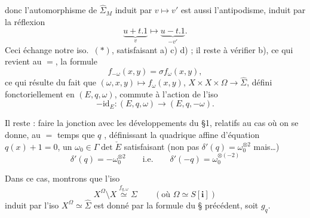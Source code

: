 \documentclass[11pt,a4paper]{article}
\begin{document}
donc l'automorphisme de $\hat{\Sigma}_{M}$ induit par $v \mapsto v'$ est aussi l'antipodisme, induit par la réflexion
\[
  \underset{v}{\underbrace{u + t.1}} \longmapsto \underset{-v'}{\underbrace{u - t.1}} .
\]
Ceci  échange  notre iso.\ $(\ast)$, satisfaisant a) c) d) ; il reste à vérifier b), ce qui revient au $=$, la formule
\[
  f_{-\omega}(x,y) = \sigma f_{\omega}(x,y),
\]
ce qui résulte du fait que $(\omega, x, y) \mapsto f_{\omega}(x,y)$, $X \times X \times \Omega \longrightarrow \hat{\Sigma}$,  défini fonctoriellement en $(E, q, \omega)$, commute à l'action de l'iso
\[
  -\mathrm{id}_{E} : (E, q, \omega) \longrightarrow (E, q, -\omega).
\]

Il reste : faire la jonction avec les développements du §1, relatifs au cas où on se donne, au $=$ temps que $q$ , définissant la quadrique affine d'équation $q(x) + 1 = 0$, un $\omega_{0} \in \Gamma \det \check{E}$ satisfaisant (non pas $\delta'(q) = \omega_{0}^{\otimes 2}$ mais…)
\[
  \delta'(q) = -\omega_{0}^{\otimes 2} \qquad \text{i.e.} \qquad \delta'(-q) = \omega_{0}^{\otimes(-2)}
\]

Dans ce cas, montrons que l'iso
\[
  X^{\Omega} \setminus X \overset{f_{q,\omega}}{\simeq} \Sigma \qquad (\text{où } \Omega \simeq S[\mathbf{i}])
\]
induit par l'iso $X^{\Omega} \simeq \hat{\Sigma}$ est donné par la formule du § précédent, \struck{\ill{}} soit $g_{q}$.
\end{document}
